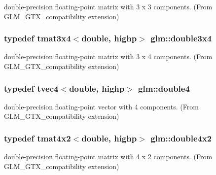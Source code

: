 double-\/precision floating-\/point matrix with 3 x 3 components. (From G\+L\+M\+\_\+\+G\+T\+X\+\_\+compatibility extension) 

\hypertarget{group__gtx__compatibility_gaa30d4862bab3c5aa40225105a06b62cc}{}
\subsubsection[{double3x4}]{\setlength{\rightskip}{0pt plus 5cm}typedef tmat3x4$<$double, highp$>$ {\bf glm\+::double3x4}}\label{group__gtx__compatibility_gaa30d4862bab3c5aa40225105a06b62cc}


double-\/precision floating-\/point matrix with 3 x 4 components. (From G\+L\+M\+\_\+\+G\+T\+X\+\_\+compatibility extension) 

\hypertarget{group__gtx__compatibility_ga43d433fc74b24a45801e2be74e7f6fca}{}
\subsubsection[{double4}]{\setlength{\rightskip}{0pt plus 5cm}typedef tvec4$<$double, highp$>$ {\bf glm\+::double4}}\label{group__gtx__compatibility_ga43d433fc74b24a45801e2be74e7f6fca}


double-\/precision floating-\/point vector with 4 components. (From G\+L\+M\+\_\+\+G\+T\+X\+\_\+compatibility extension) 

\hypertarget{group__gtx__compatibility_ga66ee22fb774d38f1484670c1afa230da}{}
\subsubsection[{double4x2}]{\setlength{\rightskip}{0pt plus 5cm}typedef tmat4x2$<$double, highp$>$ {\bf glm\+::double4x2}}\label{group__gtx__compatibility_ga66ee22fb774d38f1484670c1afa230da}


double-\/precision floating-\/point matrix with 4 x 2 components. (From G\+L\+M\+\_\+\+G\+T\+X\+\_\+compatibility extension) 

